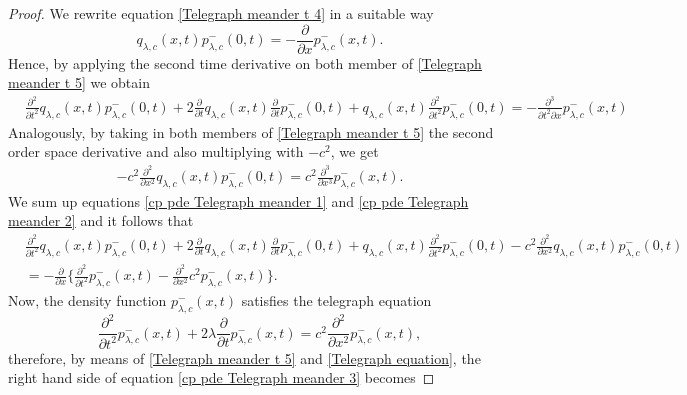 \documentclass[10pt,a4paper]{amsart}
\begin{document}
\begin{proof}
We rewrite equation \eqref{Telegraph meander t 4} in a suitable way
\begin{equation}\label{Telegraph meander t 5}
q_{\lambda,c}(x,t)p^{-}_{\lambda,c}(0,t) = -\frac{\partial}{\partial x}p^{-}_{\lambda,c}(x,t).
\end{equation}
Hence, by applying the second time derivative on both member of \eqref{Telegraph meander t 5} we obtain
\begin{align}\label{cp pde Telegraph meander 1}
&\frac{\partial^2}{\partial t^2}q_{\lambda,c}(x,t)p^{-}_{\lambda,c}(0,t)+2\frac{\partial}{\partial t}q_{\lambda,c}(x,t)\frac{\partial}{\partial t}p^{-}_{\lambda,c}(0,t)+q_{\lambda,c}(x,t)\frac{\partial^2}{\partial t^2}p^{-}_{\lambda,c}(0,t) =-\frac{\partial^3}{\partial t^2\partial x}p^{-}_{\lambda,c}(x,t)
\end{align}
Analogously, by taking in both members of \eqref{Telegraph meander t 5} the second order space derivative and also multiplying with $-c^2$, we get
\begin{align}\label{cp pde Telegraph meander 2}
-c^2\frac{\partial^2}{\partial x^2}q_{\lambda,c}(x,t)p^{-}_{\lambda,c}(0,t) = c^2\frac{\partial^3}{\partial x^3}p^{-}_{\lambda,c}(x,t).
\end{align}
We sum up equations \eqref{cp pde Telegraph meander 1} and \eqref{cp pde Telegraph meander 2} and it follows that
\begin{align}\label{cp pde Telegraph meander 3}
&\frac{\partial^2}{\partial t^2}q_{\lambda,c}(x,t)p^{-}_{\lambda,c}(0,t)+2\frac{\partial}{\partial t}q_{\lambda,c}(x,t)\frac{\partial}{\partial t}p^{-}_{\lambda,c}(0,t)+q_{\lambda,c}(x,t)\frac{\partial^2}{\partial t^2}p^{-}_{\lambda,c}(0,t) -c^2\frac{\partial^2}{\partial x^2}q_{\lambda,c}(x,t)p^{-}_{\lambda,c}(0,t)\nonumber\\&=-\frac{\partial}{\partial x}\Big\{\frac{\partial^2}{\partial t^2}p^{-}_{\lambda,c}(x,t)-\frac{\partial^2}{\partial x^2}c^2p^{-}_{\lambda,c}(x,t)\Big\}.
\end{align}
Now, the density function $p^{-}_{\lambda,c}(x,t)$ satisfies the telegraph equation
\begin{equation}\label{Telegraph equation}
\frac{\partial^2}{\partial t^2}p^{-}_{\lambda,c}(x,t) +2\lambda\frac{\partial}{\partial t}p^{-}_{\lambda,c}(x,t) =c^2\frac{\partial^2}{\partial x^2}p^{-}_{\lambda,c}(x,t),
\end{equation}
therefore, by means of \eqref{Telegraph meander t 5} and \eqref{Telegraph equation}, the right hand side of equation \eqref{cp pde Telegraph meander 3} becomes 

\end{proof}
\end{document}
